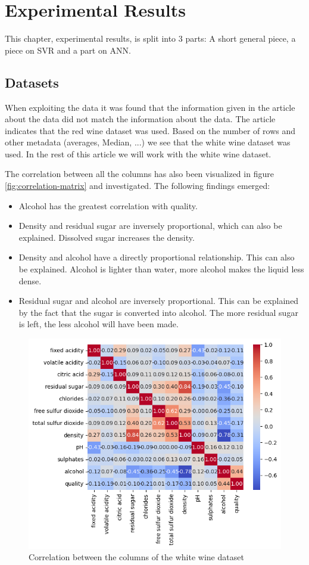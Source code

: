\documentclass{article}
\begin{document}
\section{Experimental Results}
This chapter, experimental results, is split into 3 parts: A short general piece, a piece on SVR and a part on ANN.

\subsection{Datasets}
When exploiting the data it was found that the information given in the article about the data did not match the information about the data. The article indicates that the red wine dataset was used. Based on the number of rows and other metadata (averages, Median, ...) we see that the white wine dataset was used. In the rest of this article we will work with the white wine dataset.

The correlation between all the columns has also been visualized in figure \autoref{fig:correlation-matrix} and investigated. The following findings emerged:
\begin{itemize}
	\item Alcohol has the greatest correlation with quality.
	\item Density and residual sugar are inversely proportional, which can also be explained. Dissolved sugar increases the density.
	\item Density and alcohol have a directly proportional relationship. This can also be explained. Alcohol is lighter than water, more alcohol makes the liquid less dense.
	\item Residual sugar and alcohol are inversely proportional. This can be explained by the fact that the sugar is converted into alcohol. The more residual sugar is left, the less alcohol will have been made.
\end{itemize}

\begin{figure}
	\centering
	\includegraphics[width=\linewidth]{figures/correlation_matrix.png}
	\caption{Correlation between the columns of the white wine dataset}
	\label{fig:correlation-matrix}
\end{figure}
\end{document}
